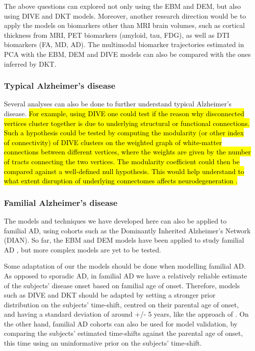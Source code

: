  The above questions can explored not only using the EBM and DEM, but also using DIVE and DKT models. Moreover, another research direction would be to apply the models on biomarkers other than MRI brain volumes, such as cortical thickness from MRI, PET biomarkers (amyloid, tau, FDG), as well as DTI biomarkers (FA, MD, AD). The multimodal biomarker trajectories estimated in PCA with the EBM, DEM and DIVE models can also be compared with the ones inferred by DKT. 

\subsubsection{Typical Alzheimer's disease}

Several analyses can also be done to further understand typical Alzheimer's disease. \hl{For example, using DIVE one could test if the reason why disconnected vertices cluster together is due to underlying structural or functional connections. Such a hypothesis could be tested by computing the modularity (or other index of connectivity) of DIVE clusters on the weighted graph of white-matter connections between different vertices, where the weights are given by the number of tracts connecting the two vertices. The modularity coefficient could then be compared against a well-defined null hypothesis. This would help understand to what extent disruption of underlying connectomes affects neurodegeneration \cite{seeley2009neurodegenerative}. }


\subsubsection{Familial Alzheimer's disease}

The models and techniques we have developed here can also be applied to familial AD, using cohorts such as the Dominantly Inherited Alzheimer's Network (DIAN). So far, the EBM and DEM models have been applied to study familial AD \cite{oxtoby2018}, but more complex models are yet to be tested. 

Some adaptation of our the models should be done when modelling familial AD. As opposed to sporadic AD, in familial AD we have a relatively reliable estimate of the subjects' disease onset based on familial age of onset. Therefore, models such as DIVE and DKT should be adapted by setting a stronger prior distribution on the subjects' time-shift, centred on their parental age of onset, and having a standard deviation of around +/- 5 years, like the approach of \cite{oxtoby2018}. On the other hand, familial AD cohorts can also be used for model validation, by comparing the subjects' estimated time-shifts against the parental age of onset, this time using an uninformative prior on the subjects' time-shift.


